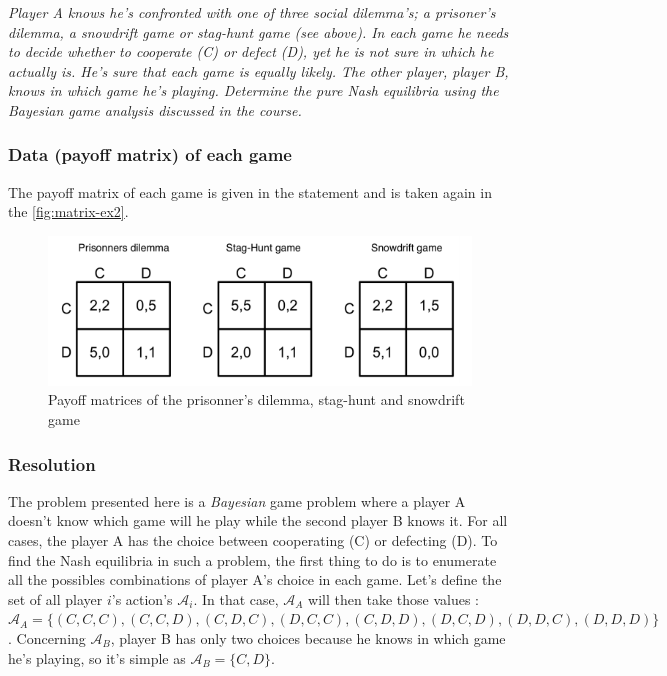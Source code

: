 \documentclass{article}
\begin{document}
\textit{Player A knows he’s	confronted with	one	of three social	dilemma’s; a prisoner’s	
dilemma, a snowdrift game or stag-hunt game	(see above). In	each game he needs to decide	whether	to cooperate (C) or	defect (D),	yet	he is not sure in which	he actually	is.		He’s sure that each	game is	equally	likely.	The	other player, player B, knows in which	game he’s playing. Determine the pure Nash equilibria using	the	Bayesian game analysis	discussed in the course.} 

\subsubsection*{Data (payoff matrix) of each game}

The payoff matrix of each game is given in the statement and is taken again in the \autoref{fig:matrix-ex2}.  

\begin{figure}[h]
  \centering
  \includegraphics[scale=0.6]{figures/matrix-ex2.png}
  \caption{Payoff matrices of the prisonner's dilemma, stag-hunt and snowdrift game}
  \label{fig:matrix-ex2}
\end{figure}

\subsubsection*{Resolution}
The problem presented here is a \textit{Bayesian} game problem where a player A doesn't know which game will he play while the second player B knows it. For all cases, the player A has the choice between cooperating (C) or defecting (D). To find the Nash equilibria in such a problem, the first thing to do is to enumerate all the possibles combinations of player A's choice in each game. Let's define the set of all player $i$'s action's $\mathcal{A}_{i}$. In that case, $\mathcal{A}_{A}$ will then take those values : $\mathcal{A}_{A} = \{(C,C,C), (C,C,D), (C,D,C), (D,C,C), (C,D,D), (D,C,D), (D,D,C), (D,D,D)\}$. Concerning $\mathcal{A}_{B}$, player B has only two choices because he knows in which game he's playing, so it's simple as $\mathcal{A}_{B} = \{C,D\}$.\\
\end{document}

